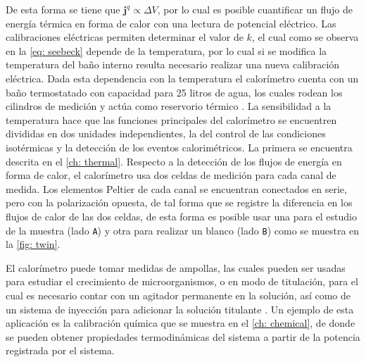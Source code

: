 	De esta forma se tiene que $\mathbf{j}^q \propto \Delta V$, por lo cual es posible cuantificar un flujo de energ\'ia t\'ermica en forma de calor con una lectura de potencial el\'ectrico. Las calibraciones el\'ectricas permiten determinar el valor de $k$, el cual como se observa en la \autoref{eq: seebeck} depende de la temperatura, por lo cual si se modifica la temperatura del ba\~no interno resulta necesario realizar una nueva calibraci\'on el\'ectrica. Dada esta dependencia con la temperatura el calor\'imetro cuenta con un ba\~no termostatado con capacidad para 25 litros de agua, los cuales rodean los cilindros de medici\'on y act\'ua como reservorio t\'ermico \cite{Suurkuusk}. La sensibilidad a la temperatura hace que las funciones principales del calor\'imetro se encuentren divididas en dos unidades independientes, la del control de las condiciones isot\'ermicas y la detecci\'on de los eventos calorim\'etricos. La primera se encuentra descrita en el \autoref{ch: thermal}. Respecto a la detecci\'on de los flujos de energ\'ia en forma de calor, el calor\'imetro usa dos celdas de medici\'on para cada canal de medida. Los elementos Peltier de cada canal se encuentran conectados en serie, pero con la polarizaci\'on opuesta, de tal forma que se registre la diferencia en los flujos de calor de las dos celdas, de esta forma es posible usar una para el estudio de la muestra (lado \texttt{A}) y otra para realizar un blanco (lado \texttt{B}) como se muestra en la \autoref{fig: twin}.
	 
	El calor\'imetro puede tomar medidas de ampollas, las cuales pueden ser usadas para estudiar el crecimiento de microorganismos, o en modo de titulaci\'on, para el cual es necesario contar con un agitador permanente en la soluci\'on, as\'i como de un sistema de inyecci\'on para adicionar la soluci\'on titulante \cite{Suurkuusk}. Un ejemplo de esta aplicaci\'on es la calibraci\'on qu\'imica que se muestra en el \autoref{ch: chemical}, de donde se pueden obtener propiedades termodin\'amicas del sistema a partir de la potencia registrada por el sistema. 	 

